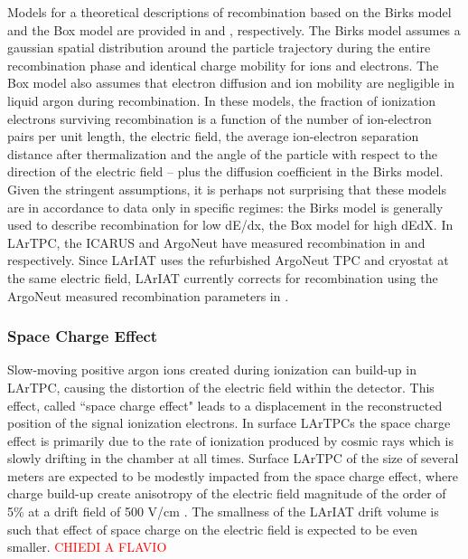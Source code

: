 Models for a theoretical descriptions of recombination based on the Birks model and the Box model are provided in \cite{0370-1298-64-10-303} and  \cite{PhysRevA.36.614}, respectively. The Birks model assumes a gaussian spatial distribution around the particle trajectory during the entire recombination phase and identical charge mobility for ions and electrons. The Box model also assumes that electron diffusion and ion mobility are negligible in liquid argon during recombination.
In these models, the fraction of ionization electrons surviving recombination is a function of the number of ion-electron pairs per unit length, the electric field, the average ion-electron separation distance after thermalization and the angle of the particle with respect to the direction of the electric field -- plus the diffusion coefficient in the Birks model. Given the stringent assumptions, it is perhaps  not surprising that these models are in accordance to data only in specific regimes: the Birks model is generally used to describe recombination for low dE/dx, the Box model for high dEdX.
In LArTPC, the ICARUS and ArgoNeut have measured recombination in \cite{Amoruso:2004dy} and \cite{1748-0221-8-08-P08005} respectively. Since LArIAT uses the refurbished ArgoNeut TPC and cryostat at the same electric field,  LArIAT currently corrects for recombination using the ArgoNeut measured recombination parameters in \cite{1748-0221-8-08-P08005}.


\subsubsection{Space Charge Effect}
Slow-moving positive argon ions created during ionization can build-up in LArTPC, causing the distortion of the
electric field within the detector. This effect, called  ``space charge effect" leads to a displacement in the reconstructed position of the signal ionization electrons. In surface LArTPCs the space charge effect is primarily due to the rate of ionization produced by cosmic rays which is slowly drifting in the chamber at all times. Surface LArTPC of the size of several meters are expected to be modestly impacted from the space charge effect, where charge build-up create anisotropy of the electric field magnitude of the order of  5\% at a drift field of 500 V/cm \cite{SpaceCharge}. The smallness of the LArIAT drift volume is such that  effect of  space charge on the electric field is expected to be even smaller. \textcolor{red}{CHIEDI A FLAVIO}

